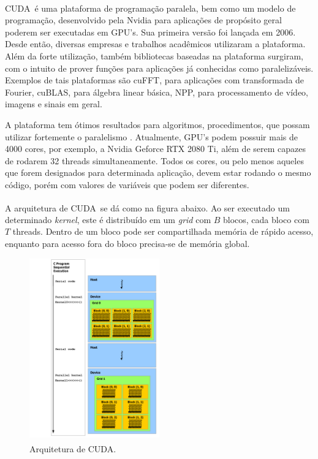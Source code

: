 \documentclass[cic,tc]{iiufrgs}
\newcommand{\reg}{\textsuperscript{\textregistered}}
\begin{document}
CUDA\reg~é uma plataforma de programação paralela, bem como um modelo de programação, 
desenvolvido pela Nvidia para aplicações de propósito geral poderem ser executadas
em GPU's.
Sua primeira versão foi lançada em 2006.
Desde então, diversas empresas e trabalhos acadêmicos utilizaram a plataforma.
Além da forte utilização, também bibliotecas baseadas na plataforma surgiram, 
com o intuito de prover funções para aplicações já conhecidas como paralelizáveis.
Exemplos de tais plataformas são cuFFT, para aplicações com transformada de Fourier,
cuBLAS, para álgebra linear básica, NPP, para processamento de vídeo, imagens e 
sinais em geral.

A plataforma tem ótimos resultados para algoritmos, procedimentos, que possam utilizar
fortemente o paralelismo \cite{CUDAMAIN}.
Atualmente, GPU's podem possuir mais de 4000 cores, por exemplo, a Nvidia Geforce RTX 2080 Ti,
além de serem capazes de rodarem 32 threads simultaneamente.
Todos os cores, ou pelo menos aqueles que forem designados para determinada aplicação,
devem estar rodando o mesmo código, porém com valores de variáveis que podem ser diferentes.

A arquitetura de CUDA\reg~se dá como na figura abaixo.
Ao ser executado um determinado \textit{kernel}, este é distribuído em um \textit{grid}
com $B$ blocos, cada bloco com $T$ threads.
Dentro de um bloco pode ser compartilhada memória de rápido acesso, enquanto para 
acesso fora do bloco precisa-se de memória global.
\begin{figure}[H]
    \caption{Arquitetura de CUDA\reg.}
    \begin{center}
        \includegraphics[width=0.5\textwidth]{img/CUDAarch.png}
    \end{center}
\end{figure}
\end{document}
